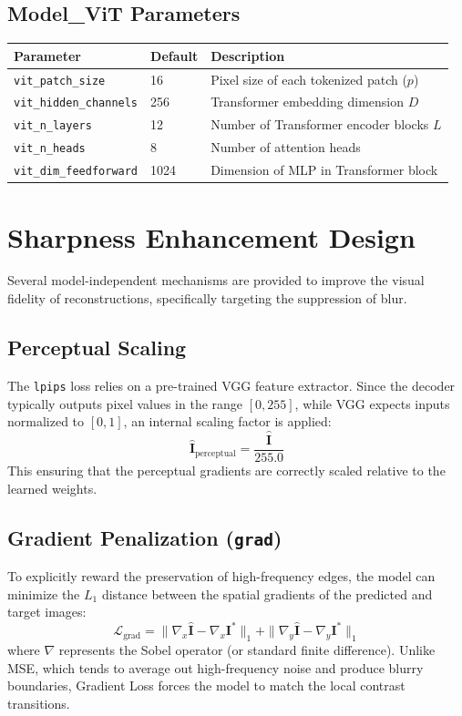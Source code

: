 \documentclass[11pt]{article}
\begin{document}
\subsection{Model\_ViT Parameters}
\begin{center}
\begin{tabular}{lll}
\toprule
\textbf{Parameter} & \textbf{Default} & \textbf{Description} \\
\midrule
\texttt{vit\_patch\_size} & 16 & Pixel size of each tokenized patch ($p$) \\
\texttt{vit\_hidden\_channels} & 256 & Transformer embedding dimension $D$ \\
\texttt{vit\_n\_layers} & 12 & Number of Transformer encoder blocks $L$ \\
\texttt{vit\_n\_heads} & 8 & Number of attention heads \\
\texttt{vit\_dim\_feedforward} & 1024 & Dimension of MLP in Transformer block \\
\bottomrule
\end{tabular}
\end{center}


\section{Sharpness Enhancement Design}

Several model-independent mechanisms are provided to improve the visual fidelity of reconstructions, specifically targeting the suppression of blur.

\subsection{Perceptual Scaling}
The \texttt{lpips} loss relies on a pre-trained VGG feature extractor. Since the decoder typically outputs pixel values in the range $[0, 255]$, while VGG expects inputs normalized to $[0, 1]$, an internal scaling factor is applied:
\[
    \hat{\mathbf{I}}_{\text{perceptual}} = \frac{\hat{\mathbf{I}}}{255.0}
\]
This ensuring that the perceptual gradients are correctly scaled relative to the learned weights.

\subsection{Gradient Penalization (\texttt{grad})}
To explicitly reward the preservation of high-frequency edges, the model can minimize the $L_1$ distance between the spatial gradients of the predicted and target images:
\[
    \mathcal{L}_{\text{grad}} = \|\nabla_x\hat{\mathbf{I}} - \nabla_x\mathbf{I}^*\|_1 + \|\nabla_y\hat{\mathbf{I}} - \nabla_y\mathbf{I}^*\|_1
\]
where $\nabla$ represents the Sobel operator (or standard finite difference). Unlike MSE, which tends to average out high-frequency noise and produce blurry boundaries, Gradient Loss forces the model to match the local contrast transitions.
\end{document}
